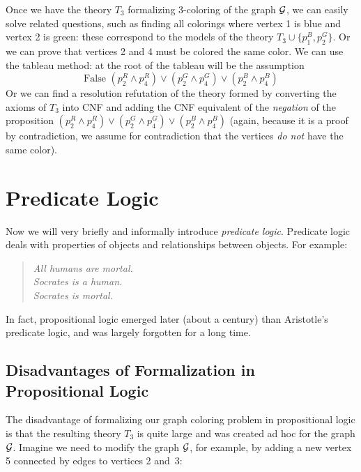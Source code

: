 Once we have the theory \(T_3\) formalizing 3-coloring of the graph \( \mathcal{G} \), we can easily solve related questions, such as finding all colorings where vertex 1 is blue and vertex 2 is green: these correspond to the models of the theory \( T_3 \cup \{ p_1^B, p_2^G\} \). Or we can prove that vertices 2 and 4 must be colored the same color. We can use the tableau method: at the root of the tableau will be the assumption
\[
\text{False  }(p_2^R \land p_4^R) \lor (p_2^G \land p_4^G) \lor (p_2^B \land p_4^B)
\]
Or we can find a resolution refutation of the theory formed by converting the axioms of \( T_3 \) into CNF and adding the CNF equivalent of the \emph{negation} of the proposition \( (p_2^R \land p_4^R) \lor (p_2^G \land p_4^G) \lor (p_2^B \land p_4^B) \) (again, because it is a proof by contradiction, we assume for contradiction that the vertices \emph{do not} have the same color).


\section{Predicate Logic}

Now we will very briefly and informally introduce \emph{predicate logic}. Predicate logic deals with properties of objects and relationships between objects. For example:
\begin{quote}\it
    All humans are mortal.\\
    Socrates is a human.\\
    Socrates is mortal.
\end{quote}
In fact, propositional logic emerged later (about a century) than Aristotle's predicate logic, and was largely forgotten for a long time.

\subsection{Disadvantages of Formalization in Propositional Logic}\label{subsection:disadvantages-of-propositional-logic}

The disadvantage of formalizing our graph coloring problem in propositional logic is that the resulting theory \( T_3 \) is quite large and was created ad hoc for the graph \( \mathcal{G} \). Imagine we need to modify the graph \( \mathcal{G} \), for example, by adding a new vertex 5 connected by edges to vertices 2 and~3:

\begin{center}
\end{center}

